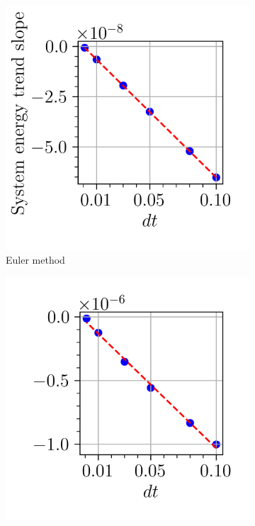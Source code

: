 \begin{figure}[!ht]
	\centering
	\begin{subfigure}[b]{0.3\textwidth}
	\centering
	\includegraphics[width=1.0\textwidth]{figures/energy_conservation_euler_method}
	\caption{Euler method}
	\label{fig:energy_cons_euler_method}
	\end{subfigure}
	\hfill
	\begin{subfigure}[b]{0.3\textwidth}
	\centering
	\includegraphics[width=1.0\textwidth]{figures/energy_conservation_euler_back}

\end{subfigure}
\end{figure}
